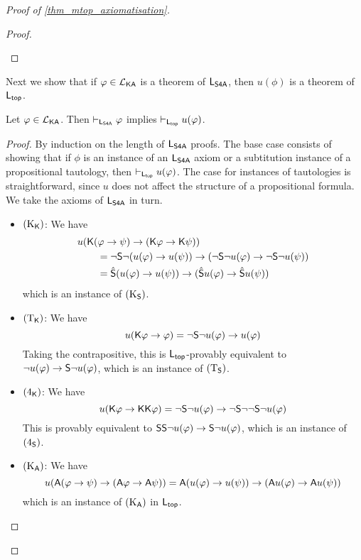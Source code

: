 \begin{proof}[Proof of \cref{thm_mtop_axiomatisation}]
\begin{proof}
\begin{itemize}
        \end{itemize}
\end{proof}

Next we show that if $\varphi \in \mathcal{L}_{\mathsf{K}\mathsf{A}}$ is a theorem of
$\mathsf{L}_{\mathsf{S4A}}$, then $u(\phi)$ is a theorem of $\mathsf{L}_{\mathsf{top}}$.

\begin{claim}
\label{claim_u_thm}

Let $\varphi \in \mathcal{L}_{\mathsf{K}\mathsf{A}}$. Then
$\vdash_{\mathsf{L}_{\mathsf{S4A}}} \varphi$ implies $\vdash_{\mathsf{L}_{\mathsf{top}}}
u(\varphi)$.

\end{claim}
    \begin{proof}
    By induction on the length of $\mathsf{L}_{\mathsf{S4A}}$ proofs. The base
case consists of showing that if $\phi$ is an instance of an
$\mathsf{L}_{\mathsf{S4A}}$ axiom or a subtitution instance of a
propositional tautology, then $\vdash_{\mathsf{L}_{\mathsf{top}}} u(\varphi)$.
The case for instances of tautologies is straightforward, since
$u$ does not affect the structure of a propositional formula.
We take the axioms of $\mathsf{L}_{\mathsf{S4A}}$ in turn.

    \begin{itemize}\small
    \item $(\text{K}_{\mathsf{K}})$: We have
        \[
        \begin{aligned}
   &u(\mathsf{K}(\varphi \to \psi) \to (\mathsf{K}\varphi \to \mathsf{K}\psi))
    \\
   &\qquad
   = \neg\mathsf{S}\neg (u(\varphi) \to u(\psi))
        \to (\neg\mathsf{S}\neg u(\varphi) \to \neg\mathsf{S}\neg u(\psi))
       \\
   &\qquad
   = \hat{\mathsf{S}} (u(\varphi) \to u(\psi)) \to
       (\hat{\mathsf{S}} u(\varphi) \to \hat{\mathsf{S}} u(\psi))
\end{aligned}\]
        which is an instance of $(\text{K}_{\mathsf{S}})$.

        \item $(\text{T}_{\mathsf{K}})$: We have
        \[
        u(\mathsf{K}\varphi \to \varphi)
= \neg\mathsf{S}\neg u(\varphi) \to u(\varphi)\]
        Taking the contrapositive, this is $\mathsf{L}_{\mathsf{top}}$-provably
equivalent to $\neg u(\varphi) \to \mathsf{S}\neg u(\varphi)$, which
is an instance of $(\text{T}_{\mathsf{S}})$.

        \item $(\text{4}_{\mathsf{K}})$: We have
        \[
        u(\mathsf{K}\varphi \to \mathsf{K}\mathsf{K}\varphi)
= \neg\mathsf{S}\neg u(\varphi) \to \neg\mathsf{S}\neg\neg\mathsf{S}\neg u(\varphi)\]
        This is provably equivalent to $\mathsf{S}\mathsf{S}\neg u(\varphi) \to
\mathsf{S}\neg u(\varphi)$, which is an instance of $(\text{4}_{\mathsf{S}})$.

        \item $(\text{K}_{\mathsf{A}})$: We have
        \[
        u(\mathsf{A}(\varphi \to \psi) \to (\mathsf{A}\varphi \to \mathsf{A}\psi))
=
\mathsf{A} (u(\varphi) \to u(\psi)) \to (\mathsf{A} u(\varphi) \to \mathsf{A} u(\psi))\]
        which is an instance of $(\text{K}_{\mathsf{A}})$ in $\mathsf{L}_{\mathsf{top}}$.


\end{itemize}
\end{proof}
\end{proof}
